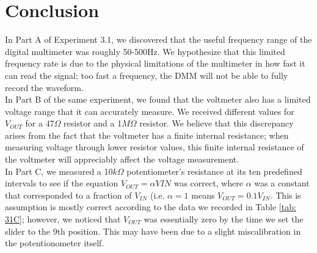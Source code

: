 \documentclass[10pt]{article}
\begin{document}
\section{Conclusion}
In Part A of Experiment 3.1, we discovered that the useful frequency range of the digital multimeter was roughly 50-500Hz. We hypothesize that this limited frequency rate is due to the physical limitations of the multimeter in how fast it can read the signal; too fast a frequency, the DMM will not be able to fully record the waveform. \\ In Part B of the same experiment, we found that the voltmeter also has a limited voltage range that it can accurately measure. We received different values for $V_{OUT}$ for a 47$\Omega$ resistor and a 1$M\Omega$ resistor. We believe that this discrepancy arises from the fact that the voltmeter has a finite internal resistance; when measuring voltage through lower resistor values, this finite internal resistance of the voltmeter will appreciably affect the voltage measurement.  \\In Part C, we measured a 10$k\Omega$ potentiometer's resistance at its ten predefined intervals to see if the equation $V_{OUT} = \alpha V{IN}$ was correct, where $\alpha$ was a constant that corresponded to a fraction of $V_{IN}$ (i.e. $\alpha = 1$ means $V_{OUT} = 0.1V_{IN}$. This is assumption is mostly correct according to the data we recorded in Table \ref{tab: 31C}; however, we noticed that $V_{OUT}$ was essentially zero by the time we set the slider to the 9th position. This may have been due to a slight miscalibration in the potentionometer itself. \\\\
\end{document}
